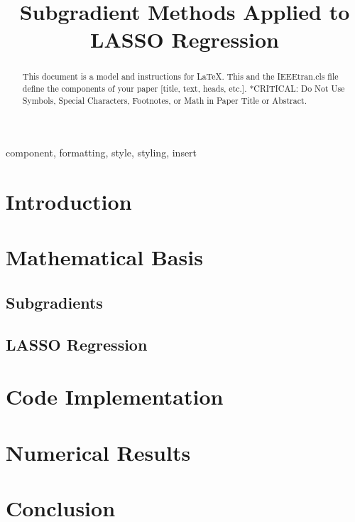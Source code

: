 \documentclass[conference]{IEEEtran}
\begin{document}
\title{
Subgradient Methods Applied to LASSO Regression
}

\author{}


\maketitle

\begin{abstract}
    This document is a model and instructions for \LaTeX.
    This and the IEEEtran.cls file define the components of your paper [title, text, heads, etc.]. *CRITICAL: Do Not Use Symbols, Special Characters, Footnotes, 
    or Math in Paper Title or Abstract.
\end{abstract}

\begin{IEEEkeywords}
    component, formatting, style, styling, insert
\end{IEEEkeywords}

\section{Introduction}
\cite{boydparksubgradients}


\section{Mathematical Basis}
\subsection{Subgradients}
\subsection{LASSO Regression}

\section{Code Implementation}

\section{Numerical Results}

\section{Conclusion}



\end{document}
